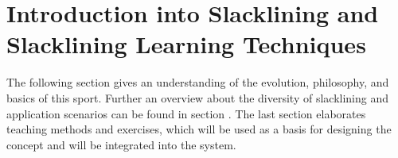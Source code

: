 \chapter{Introduction into Slacklining  and Slacklining Learning Techniques}\label{3_slacklining}
The following section \textit{} gives an understanding of the evolution, philosophy, and basics of this sport. Further an overview about the diversity of slacklining and application scenarios can be found in section \textit{}. The last section \textit{} elaborates teaching methods and exercises, which will be used as a basis for designing the concept and will be integrated into the system.
 
  
  
 
  